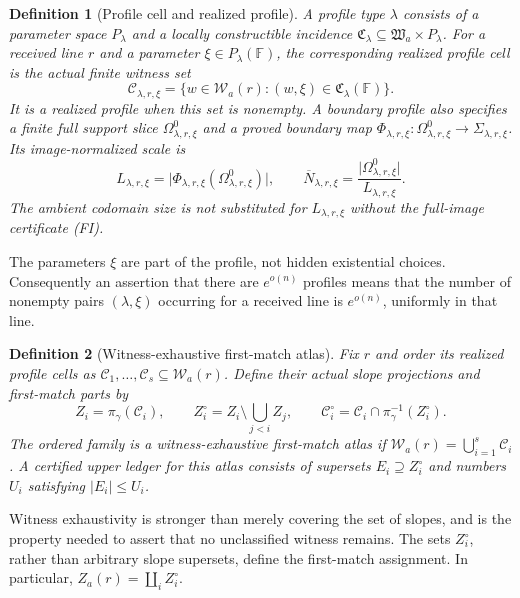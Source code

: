 \documentclass[12pt,a4paper]{amsart}
\numberwithin{equation}{section}
\newtheorem{definition}[definition]{Definition}
\theoremstyle{remark}
\newcommand{\F}{\mathbb F}
\newcommand{\Ccal}{\mathcal C}
\newcommand{\Wcal}{\mathcal W}
\newcommand{\barN}{\overline N}
\newcommand{\abs}[1]{\lvert #1\rvert}
\begin{document}
\begin{definition}[Profile cell and realized profile]
\label{def:profile-cell}
A \emph{profile type} \(\lambda\) consists of a parameter space
\(P_\lambda\) and a locally constructible incidence
\(\mathfrak C_\lambda\subseteq\mathfrak W_a\times P_\lambda\).
For a received line \(r\) and a parameter
\(\xi\in P_\lambda(\F)\), the corresponding \emph{realized profile cell}
is the actual finite witness set
\[
 \Ccal_{\lambda,r,\xi}
   =\{w\in\Wcal_a(r):(w,\xi)\in
       \mathfrak C_\lambda(\F)\}.
\]
It is a realized profile when this set is nonempty.  A boundary profile
also specifies a finite full support slice \(\Omega^0_{\lambda,r,\xi}\)
and a proved boundary map
\(\Phi_{\lambda,r,\xi}:\Omega^0_{\lambda,r,\xi}\to\Sigma_{\lambda,r,\xi}\).
Its image-normalized scale is
\[
 L_{\lambda,r,\xi}
   =\abs{\Phi_{\lambda,r,\xi}(\Omega^0_{\lambda,r,\xi})},
 \qquad
 \barN_{\lambda,r,\xi}
   =\frac{\abs{\Omega^0_{\lambda,r,\xi}}}
          {L_{\lambda,r,\xi}}.
 \tag{2.2}\label{eq:realized-profile-scale}
\]
The ambient codomain size is not substituted for \(L_{\lambda,r,\xi}\)
without the full-image certificate \textup{(FI)}.
\end{definition}

The parameters \(\xi\) are part of the profile, not hidden existential
choices.  Consequently an assertion that there are \(e^{o(n)}\) profiles
means that the number of nonempty pairs \((\lambda,\xi)\) occurring for a
received line is \(e^{o(n)}\), uniformly in that line.

\begin{definition}[Witness-exhaustive first-match atlas]
\label{def:first-match}
Fix \(r\) and order its realized profile cells as
\(\Ccal_1,\ldots,\Ccal_s\subseteq\Wcal_a(r)\).  Define their \emph{actual}
slope projections and first-match parts by
\[
 Z_i=\pi_\gamma(\Ccal_i),\qquad
 Z_i^\circ=Z_i\setminus\bigcup_{j<i}Z_j,\qquad
 \Ccal_i^\circ=\Ccal_i\cap\pi_\gamma^{-1}(Z_i^\circ).
 \tag{2.3}\label{eq:first-match-projections}
\]
The ordered family is a \emph{witness-exhaustive first-match atlas} if
\(\Wcal_a(r)=\bigcup_{i=1}^s\Ccal_i\).  A certified upper ledger for this
atlas consists of supersets \(E_i\supseteq Z_i^\circ\) and numbers
\(U_i\) satisfying \(\abs{E_i}\le U_i\).
\end{definition}

Witness exhaustivity is stronger than merely covering the set of slopes,
and is the property needed to assert that no unclassified witness remains.
The sets \(Z_i^\circ\), rather than arbitrary slope supersets, define the
first-match assignment.  In particular,
\(Z_a(r)=\coprod_i Z_i^\circ\).
\end{document}

